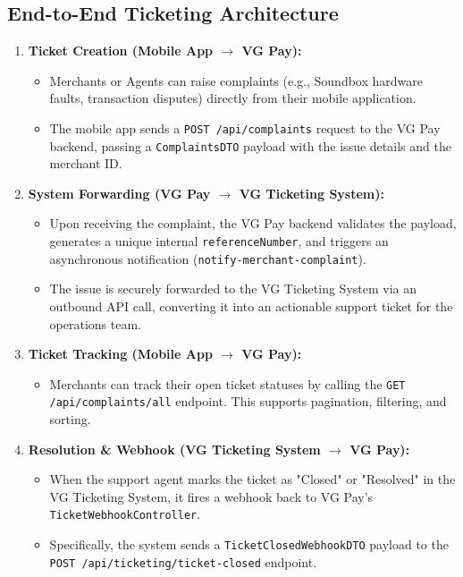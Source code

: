 \documentclass[11pt,a4paper]{article}
\begin{document}
\subsection{End-to-End Ticketing Architecture}
\begin{enumerate}
    \item \textbf{Ticket Creation (Mobile App $\rightarrow$ VG Pay):}
    \begin{itemize}
        \item Merchants or Agents can raise complaints (e.g., Soundbox hardware faults, transaction disputes) directly from their mobile application.
        \item The mobile app sends a \texttt{POST /api/complaints} request to the VG Pay backend, passing a \texttt{ComplaintsDTO} payload with the issue details and the merchant ID.
    \end{itemize}

    \item \textbf{System Forwarding (VG Pay $\rightarrow$ VG Ticketing System):}
    \begin{itemize}
        \item Upon receiving the complaint, the VG Pay backend validates the payload, generates a unique internal \texttt{referenceNumber}, and triggers an asynchronous notification (\texttt{notify-merchant-complaint}).
        \item The issue is securely forwarded to the VG Ticketing System via an outbound API call, converting it into an actionable support ticket for the operations team.
    \end{itemize}

    \item \textbf{Ticket Tracking (Mobile App $\rightarrow$ VG Pay):}
    \begin{itemize}
        \item Merchants can track their open ticket statuses by calling the \texttt{GET /api/\allowbreak complaints/\allowbreak all} endpoint. This supports pagination, filtering, and sorting.
    \end{itemize}

    \item \textbf{Resolution \& Webhook (VG Ticketing System $\rightarrow$ VG Pay):}
    \begin{itemize}
        \item When the support agent marks the ticket as "Closed" or "Resolved" in the VG Ticketing System, it fires a webhook back to VG Pay's \texttt{TicketWebhookController}.
        \item Specifically, the system sends a \texttt{TicketClosed\allowbreak WebhookDTO} payload to the \texttt{POST /api/\allowbreak ticketing/\allowbreak ticket-closed} endpoint.
    \end{itemize}


\end{enumerate}
\end{document}
